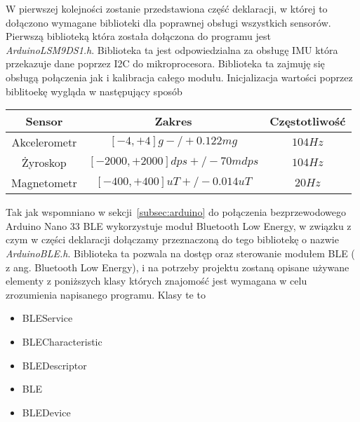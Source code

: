 W pierwszej kolejności zostanie przedstawiona część deklaracji, w której to dołączono wymagane biblioteki dla poprawnej obsługi wszystkich sensorów. Pierwszą biblioteką która została dołączona do programu jest \textit{Arduino\textunderscore LSM9DS1.h}. Biblioteka ta jest odpowiedzialna za obsługę IMU która przekazuje dane poprzez I2C do mikroprocesora. Biblioteka ta zajmuję się obsługą połączenia jak i kalibracja całego modułu. Inicjalizacja wartości poprzez biblitoekę wygląda w następujący sposób~\cite{ArduinoIMU}
\begin{center}
\begin{tabular}{|c|c|c|}
\hline
Sensor & Zakres & Częstotliwość \\ \hline
Akcelerometr & $[-4,+4]g -/+0.122 mg$ & $104 Hz$\\ \hline
Żyroskop & $[-2000, +2000] dps +/-70 mdps$ & $104 Hz$\\ \hline
Magnetometr & $[-400, +400] uT +/-0.014 uT$ & $20 Hz$ \\ \hline
\hline
\end{tabular}
\end{center}
Tak jak wspomniano w sekcji~\ref{subsec:arduino} do połączenia bezprzewodowego Arduino Nano 33 BLE wykorzystuje moduł Bluetooth Low Energy, w związku z czym w części deklaracji dołączamy przeznaczoną do tego bibliotekę o nazwie \textit{ArduinoBLE.h}. Biblioteka ta pozwala na dostęp oraz sterowanie modułem BLE ( z ang. Bluetooth Low Energy), i na potrzeby projektu zostaną opisane używane elementy z poniższych klasy których znajomość jest wymagana w celu zrozumienia napisanego programu. Klasy te to
\begin{itemize}
\item BLEService
\item BLECharacteristic
\item BLEDescriptor
\item BLE
\item BLEDevice
\end{itemize}
